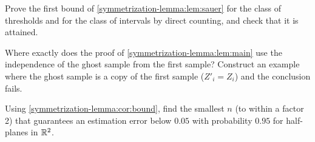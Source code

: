 \begin{notechapter}
\begin{exercise}\label{symmetrization-lemma:exr:2}
Prove the first bound of \cref{symmetrization-lemma:lem:sauer} for the class
of thresholds and for the class of intervals by direct counting, and check
that it is attained.
\end{exercise}

\begin{exercise}\label{symmetrization-lemma:exr:3}
Where exactly does the proof of \cref{symmetrization-lemma:lem:main} use the
independence of the ghost sample from the first sample? Construct an example
where the ghost sample is a copy of the first sample ($Z'_i = Z_i$) and the
conclusion fails.
\end{exercise}

\begin{exercise}\label{symmetrization-lemma:exr:4}
Using \cref{symmetrization-lemma:cor:bound}, find the smallest $n$ (to within
a factor 2) that guarantees an estimation error below $0.05$ with probability
$0.95$ for half-planes in $\mathbb{R}^2$.
\end{exercise}
\end{notechapter}
